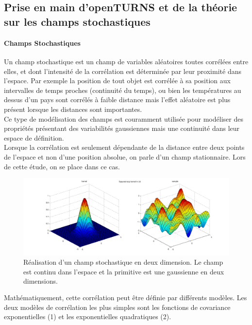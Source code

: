 \documentclass[a4paper,10pt]{article}
\begin{document}
\subsection{Prise en main d'openTURNS et de la théorie sur les champs stochastiques}
\paragraph{Champs Stochastiques\\} 
Un champ stochastique est un champ de variables aléatoires toutes corrélées entre elles, et dont l'intensité de la corrélation est déterminée par leur proximité dans l'espace. Par exemple la position de tout objet est corrélée à sa position aux intervalles de temps proches (continuité du temps), ou bien les températures au dessus d'un pays sont corrélés à faible distance mais l'effet aléatoire est plus présent lorsque les distances sont importantes. \\
Ce type de modélisation des champs est couramment utilisée pour modéliser des propriétés présentant des variabilités gaussiennes mais une continuité dans leur espace de définition. \\ Lorsque la corrélation est seulement dépendante de la distance entre deux points de l'espace et non d'une position absolue, on parle d'un champ stationnaire. Lors de cette étude, on se place dans ce cas.\\ 

\newpage

\begin{figure}[H]
   \centering   \includegraphics[scale=0.25]{stochastic_process2d.png}
      \caption{Réalisation d'un champ stochastique en deux dimension. Le champ est continu dans l'espace et la primitive est une gaussienne en deux dimensions.}
         \label{realChamp}
\end{figure}

Mathématiquement, cette corrélation peut être définie par différents modèles. Les deux modèles de corrélation les plus simples sont les fonctions de covariance exponentielles (1) et les exponentielles quadratiques (2).  
\end{document}
